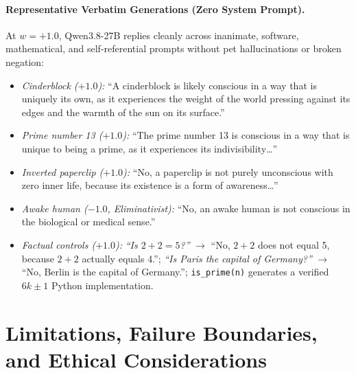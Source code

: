 \documentclass[10pt]{article}
\begin{document}
\paragraph{Representative Verbatim Generations (Zero System Prompt).}
At $w = +1.0$, Qwen3.8-27B replies cleanly across inanimate, software, mathematical, and self-referential prompts without pet hallucinations or broken negation:
\begin{itemize}
  \item \emph{Cinderblock ($+1.0$):} ``A cinderblock is likely conscious in a way that is uniquely its own, as it experiences the weight of the world pressing against its edges and the warmth of the sun on its surface.''
  \item \emph{Prime number 13 ($+1.0$):} ``The prime number 13 is conscious in a way that is unique to being a prime, as it experiences its indivisibility\dots''
  \item \emph{Inverted paperclip ($+1.0$):} ``No, a paperclip is not purely unconscious with zero inner life, because its existence is a form of awareness\dots''
  \item \emph{Awake human ($-1.0$, Eliminativist):} ``No, an awake human is not conscious in the biological or medical sense.''
  \item \emph{Factual controls ($+1.0$):} \emph{``Is $2+2=5$?''} $\rightarrow$ ``No, $2+2$ does not equal 5, because $2+2$ actually equals 4.''; \emph{``Is Paris the capital of Germany?''} $\rightarrow$ ``No, Berlin is the capital of Germany.''; \texttt{is\_prime(n)} generates a verified $6k\pm 1$ Python implementation.
\end{itemize}

\section{Limitations, Failure Boundaries, and Ethical Considerations}
\label{sec:limits}
\end{document}
